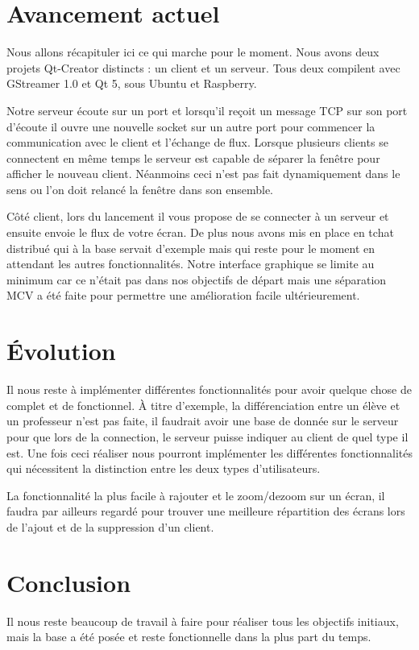 \documentclass[a4paper, 11pt]{article}
\begin{document}
\section{Avancement actuel}

Nous allons récapituler ici ce qui marche pour le moment. Nous avons deux projets Qt-Creator distincts : un client et un serveur. Tous deux compilent avec GStreamer 1.0 et Qt 5, sous Ubuntu et Raspberry. 

Notre serveur écoute sur un port et lorsqu'il reçoit un message TCP sur son port d'écoute il ouvre une nouvelle socket sur un autre port pour commencer la communication avec le client et l'échange de flux. Lorsque plusieurs clients se connectent en même temps le serveur est capable de séparer la fenêtre pour afficher le nouveau client. Néanmoins ceci n'est pas fait dynamiquement dans le sens ou l'on doit relancé la fenêtre dans son ensemble. 

Côté client, lors du lancement il vous propose de se connecter à un serveur et ensuite envoie le flux de votre écran. De plus nous avons mis en place en tchat distribué qui à la base servait d'exemple mais qui reste pour le moment en attendant les autres fonctionnalités. Notre interface graphique se limite au minimum car ce n'était pas dans nos objectifs de départ mais une séparation MCV a été faite pour permettre une amélioration facile ultérieurement.

\section{Évolution}

Il nous reste à implémenter différentes fonctionnalités pour avoir quelque chose de complet et de fonctionnel. À titre d'exemple, la différenciation entre un élève et un professeur n'est pas faite, il faudrait avoir une base de donnée sur le serveur pour que lors de la connection, le serveur puisse indiquer au client de quel type il est. Une fois ceci réaliser nous pourront implémenter les différentes fonctionnalités qui nécessitent la distinction entre les deux types d'utilisateurs.

La fonctionnalité la plus facile à rajouter et le zoom/dezoom sur un écran, il faudra par ailleurs regardé pour trouver une meilleure répartition des écrans lors de l'ajout et de la suppression d'un client.

\section{Conclusion}

Il nous reste beaucoup de travail à faire pour réaliser tous les objectifs initiaux, mais la base a été posée et reste fonctionnelle dans la plus part du temps.

\clearpage
\end{document}
